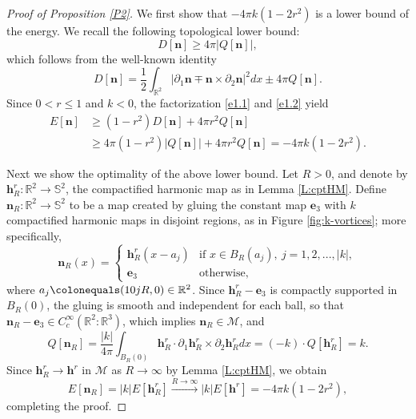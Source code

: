 \documentclass{amsart}
\numberwithin{equation}{section}
\theoremstyle{definition}
\theoremstyle{remark}
\newcommand{\R}{\mathbb{R}}
\renewcommand{\S}{\mathbb{S}}
\newcommand{\boM}{\mathcal{M}}
\newcommand{\rd}{{\partial}}								%
\newcommand{\bh}{{\mathbf{h}}}
\newcommand{\bn}{{\mathbf{n}}}
\newcommand{\boe}{{\mathbf{e}}}
\begin{document}
%
%
\begin{proof}[Proof of Proposition \ref{P2}]
We first show that $-4\pi k (1-2r^2)$ is a lower bound of the energy. 
We recall the following topological lower bound:
\begin{equation}\label{e1.2}
D[\bn] \ge 4\pi |Q[\bn]|,
\end{equation}
which follows from the well-known identity
\begin{equation}\label{eq:factD}
D[\bn] = \frac 12\int_{\R^2} |\rd_1 \bn \mp \bn\times \rd_2 \bn\bm|^2 dx \pm 
4\pi Q[\bn].
\end{equation}
Since $0<r\le 1$ and $k<0$, 
the factorization \eqref{e1.1} and  \eqref{e1.2} yield
\begin{align*}
    E[\bn] &\ge (1-r^2) D[\bn] +4\pi r^2 Q[\bn]\\
    &\ge 
4\pi(1-r^2)  |Q[\bn]| +4\pi r^2 Q[\bn] = -4 \pi k (1-2r^2).
\end{align*}

Next we show the optimality of the above lower bound.
Let $R>0$, and denote by $\bh^r_{R}: \R^2\to \S^2$, the compactified harmonic map as in Lemma \ref{L:cptHM}. 
Define $\bn_R:\R^2\to\S^2$ to be a map created by gluing the constant map $\boe_3$ with $k$ compactified harmonic maps in disjoint regions, as in Figure \ref{fig:k-vortices}; more specifically,
\begin{equation}\label{eq:defnR}
\bn_R (x) = 
\begin{cases}
    \bh^r_{R} (x-a_j) & \text{if } x\in B_R(a_j),\ j=1,2,...,|k|,\\
    \boe_3 & \text{otherwise},
\end{cases}
\end{equation}
where $a_j\colonequals(10jR,0)\in\R^2$. 
Since $\bh^r_R-\boe_3$ is compactly supported in $B_{R}(0)$, 
the gluing is smooth and independent for each ball, so that 
$\bn_R-\boe_3\in C^\infty_c(\R^2:\R^3)$, 
which implies $\bn_R\in \boM$, 
and
$$
Q[\bn_R] = \frac {|k|}{4\pi}
\int_{B_{R}(0)} \bh^r_R \cdot \rd_1 \bh^r_R \times \rd_2 \bh^r_R dx
= 
(-k)\cdot Q[\bh^r_R] = k.
$$
Since $\bh^r_R\to \bh^r$ in $\boM$ as $R\to\infty$ by Lemma \ref{L:cptHM}, 
we obtain
$$
E[\bn_R] = |k| E[\bh^r_R] \xrightarrow{R\to\infty} 
|k| E[\bh^r] =-4\pi k (1-2r^2),
$$ 
completing the proof.
\end{proof}
%
%
\end{document}
